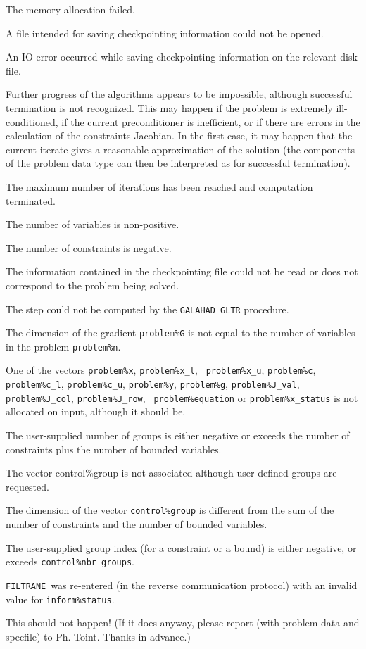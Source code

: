 \documentclass{galahad}
\newcommand{\packagename}{FILTRANE}
\newcommand{\filtrane}{{\tt \packagename}}
\begin{document}
\begin{description}

 The memory allocation failed.

 A file intended for saving checkpointing information could not be
opened.

 An IO error occurred while saving checkpointing information on
the relevant disk file.

 Further progress of the algorithms appears to be impossible,
although successful termination is not recognized. This may happen if the
problem is extremely ill-conditioned, if the current preconditioner is
inefficient, or if there are errors in the calculation of the constraints
Jacobian.  In the first case, it may happen that the current iterate gives a
reasonable approximation of the solution (the components of the problem data
type can then be interpreted as for successful termination).

 The maximum number of iterations has been reached and computation
terminated.

 The number of variables is non-positive.

 The number of constraints is negative.

 The information contained in the checkpointing file could not
be read or does not correspond to the problem being solved.

 The step could not be computed by the {\tt GALAHAD\_GLTR} procedure.

 The dimension of the gradient {\tt problem\%G} is not equal to
the number of variables in the problem {\tt problem\%n}.

 One of the vectors {\tt problem\%x}, {\tt problem\%x\_l}, {\tt
problem\%x\_u}, {\tt problem\%c}, {\tt problem\%c\_l}, {\tt problem\%c\_u},
{\tt problem\%y}, {\tt problem\%g}, {\tt problem\%J\_val}, {\tt
problem\%J\_col}, {\tt problem\%J\_row}, {\tt
problem\%equation} or {\tt problem\%x\_status} is not allocated on input,
although it should be.

 The user-supplied number of groups is either negative
or exceeds the number of constraints plus the number of bounded variables.

 The vector control\%group is not associated although user-defined
groups are requested.

 The dimension of the vector {\tt control\%group} is different
from the sum of the number of constraints and the number of bounded
variables.

 The user-supplied group index (for a constraint or a bound) is
either negative, or exceeds  {\tt control\%nbr\_groups}.

 \filtrane\ was re-entered (in the reverse communication
protocol) with an invalid value for {\tt inform\%status}.

 This should not happen! (If it does anyway, please
report (with problem data and specfile) to Ph. Toint. Thanks in advance.)
\end{description}
\end{document}
